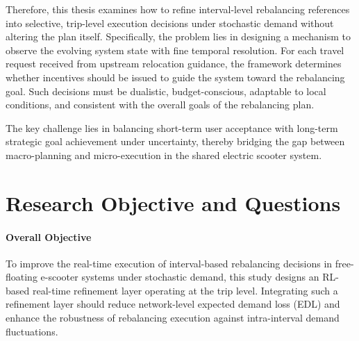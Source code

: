 Therefore, this thesis examines how to refine interval-level rebalancing references into selective, trip-level execution decisions under stochastic demand without altering the plan itself. Specifically, the problem lies in designing a mechanism to observe the evolving system state with fine temporal resolution. For each travel request received from upstream relocation guidance, the framework determines whether incentives should be issued to guide the system toward the rebalancing goal. Such decisions must be dualistic, budget-conscious, adaptable to local conditions, and consistent with the overall goals of the rebalancing plan.

The key challenge lies in balancing short-term user acceptance with long-term strategic goal achievement under uncertainty, thereby bridging the gap between macro-planning and micro-execution in the shared electric scooter system.

\section{Research Objective and Questions}

\paragraph{Overall Objective}


To improve the real-time execution of interval-based rebalancing decisions in
free-floating e-scooter systems under stochastic demand, this study designs an
RL-based real-time refinement layer operating at the trip level.
Integrating such a refinement layer should reduce
network-level expected demand loss (EDL) and enhance the robustness of
rebalancing execution against intra-interval demand fluctuations.


